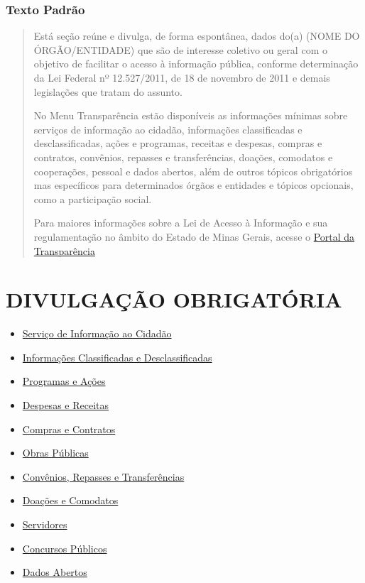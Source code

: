 \documentclass[
]{book}
\providecommand{\tightlist}{%
  \setlength{\itemsep}{0pt}\setlength{\parskip}{0pt}}
\begin{document}
\hypertarget{texto-padruxe3o}{%
\subsection{Texto Padrão}\label{texto-padruxe3o}}

\begin{quote}
Está seção reúne e divulga, de forma espontânea, dados do(a) (NOME DO ÓRGÃO/ENTIDADE) que são de interesse coletivo ou geral com o objetivo de facilitar o acesso à informação pública, conforme determinação da Lei Federal nº 12.527/2011, de 18 de novembro de 2011 e demais legislações que tratam do assunto.

No Menu Transparência estão disponíveis as informações mínimas sobre serviços de informação ao cidadão, informações classificadas e desclassificadas, ações e programas, receitas e despesas, compras e contratos, convênios, repasses e transferências, doações, comodatos e cooperações, pessoal e dados abertos, além de outros tópicos obrigatórios mas específicos para determinados órgãos e entidades e tópicos opcionais, como a participação social.

Para maiores informações sobre a Lei de Acesso à Informação e sua regulamentação no âmbito do Estado de Minas Gerais, acesse o \href{http://www.transparencia.mg.gov.br}{Portal da Transparência}
\end{quote}

\hypertarget{divulgauxe7uxe3o-obrigatuxf3ria}{%
\chapter{DIVULGAÇÃO OBRIGATÓRIA}\label{divulgauxe7uxe3o-obrigatuxf3ria}}

\begin{itemize}
\tightlist
\item
  \href{servico-informacao.html}{Serviço de Informação ao Cidadão}
\item
  \href{informacoes-classificadas.html}{Informações Classificadas e Desclassificadas}
\item
  \href{programas-acoes.html}{Programas e Ações}
\item
  \href{despesas-receitas.html}{Despesas e Receitas}
\item
  \href{compras-contratos.html}{Compras e Contratos}
\item
  \href{obras-publicas.html}{Obras Públicas}
\item
  \href{convenios-repasses.html}{Convênios, Repasses e Transferências}
\item
  \href{doacoes.html}{Doações e Comodatos}
\item
  \href{servidores.html}{Servidores}
\item
  \href{concursos-publicos.html}{Concursos Públicos}
\item
  \href{dados-abertos.html}{Dados Abertos}
\end{itemize}
\end{document}

